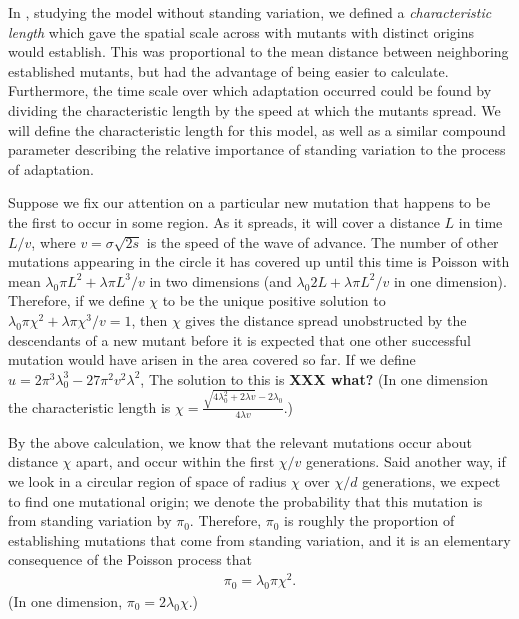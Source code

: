 \documentclass{article}
\begin{document}

In \citet{ralphcoop2010}, studying the model without standing variation,
we defined a {\em characteristic length} which gave the spatial scale across with mutants with distinct origins would establish.
This was proportional to the mean distance between neighboring established mutants,
but had the advantage of being easier to calculate.
Furthermore, the time scale over which adaptation occurred could be found by dividing the characteristic length 
by the speed at which the mutants spread.
We will define the characteristic length for this model,
as well as a similar compound parameter describing the relative importance of standing variation to the process of adaptation.

Suppose we fix our attention on a particular new mutation that happens to be the first to occur in some region.
As it spreads, it will cover a distance $L$ in time $L/v$, where $v = \sigma \sqrt{2s}$ is the speed of the wave of advance.
The number of other mutations appearing in the circle it has covered up until this time is Poisson with mean
$\lambda_0 \pi L^2 + \lambda \pi L^3 /v$ in two dimensions
(and $\lambda_0 2 L + \lambda \pi L^2 /v$ in one dimension).
Therefore, if we define $\chi$ to be the unique positive solution to
$\lambda_0 \pi \chi^2 + \lambda \pi \chi^3 /v = 1$,
then $\chi$ gives the distance spread unobstructed by the descendants of a new mutant
before it is expected that one other successful mutation would have arisen in the area covered so far.
If we define $u = 2 \pi^3 \lambda_0^3 - 27 \pi^2 v^2 \lambda^2$,
The solution to this is {\bf XXX what?}
(In one dimension the characteristic length is $\chi = \frac{ \sqrt{ 4 \lambda_0^2 + 2\lambda v } - 2 \lambda_0 }{ 4 \lambda v }$.)

By the above calculation, we know that the relevant mutations occur about distance $\chi$ apart, 
and occur within the first $\chi/v$ generations.
Said another way, if we look in a circular region of space of radius $\chi$ over $\chi/d$ generations,
we expect to find one mutational origin;
we denote the probability that this mutation is from standing variation by $\pi_0$.
Therefore, $\pi_0$ is roughly the proportion of establishing mutations that come from standing variation,
and it is an elementary consequence of the Poisson process that
\begin{align} \label{eqn:pizero}
    \pi_0 = \lambda_0 \pi \chi^2 .
\end{align}
(In one dimension, $\pi_0 = 2 \lambda_0 \chi$.)
\end{document}
